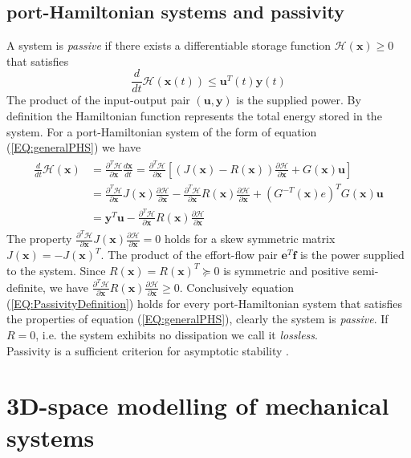 \documentclass[a4paper,twoside, openright,12pt]{report}
\newcommand{\f}[1]{\boldsymbol{#1}}
\begin{document}
{\subsection{port-Hamiltonian systems and passivity}
A system is \emph{passive} if there exists a differentiable storage function $\mathcal{H}(\f{x}) \geq 0$ that satisfies 
\begin{equation}\label{EQ:PassivityDefinition}
\frac{d}{dt}\mathcal{H}(\f{x}(t)) \leq \f{u}^T(t) \f{y}(t)
\end{equation}
The product of the input-output pair $(\f{u},\f{y})$ is the supplied power. By definition the Hamiltonian function represents the total energy stored in the system. For a port-Hamiltonian system of the form of equation (\ref{EQ:generalPHS}) we have
\begin{eqnarray}
\begin{aligned}
\frac{d}{dt}\mathcal{H}(\f{x}) &= \frac{\partial^T \mathcal{H}}{\partial \f{x}} \frac{d\f{x}}{dt} = \frac{\partial^T \mathcal{H}}{\partial \f{x}}\left[(J(\f{x})-R(\f{x}))\frac{\partial \mathcal{H}}{\partial \f{x}} + G(\f{x})\f{u}\right]  \\
&= \frac{\partial^T \mathcal{H}}{\partial \f{x}}J(\f{x})\frac{\partial \mathcal{H}}{\partial \f{x}} - \frac{\partial^T \mathcal{H}}{\partial \f{x}}R(\f{x})\frac{\partial \mathcal{H}}{\partial \f{x}} + (G^{-T}(\f{x})e)^T G(\f{x})\f{u}  \\
&= \f{y}^T\f{u} - \frac{\partial^T \mathcal{H}}{\partial \f{x}}R(\f{x})\frac{\partial \mathcal{H}}{\partial \f{x}}
\end{aligned}
\end{eqnarray}
The property $\frac{\partial^T \mathcal{H}}{\partial \f{x}}J(\f{x})\frac{\partial \mathcal{H}}{\partial \f{x}}=0$ holds for a skew symmetric matrix $J(\f{x}) = -J(\f{x})^T$. The product of the effort-flow pair $\f{e}^T\f{f}$ is the power supplied to the system. Since $R(\f{x})=R(\f{x})^T \succeq 0$ is symmetric and positive semi-definite, we have $\frac{\partial^T \mathcal{H}}{\partial \f{x}}R(\f{x})\frac{\partial \mathcal{H}}{\partial \f{x}} \geq 0$. Conclusively equation (\ref{EQ:PassivityDefinition}) holds for every port-Hamiltonian system that satisfies the properties of equation (\ref{EQ:generalPHS}), clearly the system is \emph{passive}. If $R=0$, i.e. the system exhibits no dissipation we call it \emph{lossless}.\\
Passivity is a sufficient criterion for asymptotic stability \cite{Ortega_01}.  
\section{3D-space modelling of mechanical systems}\label{S:3Dspace-modelling}


}
\end{document}
